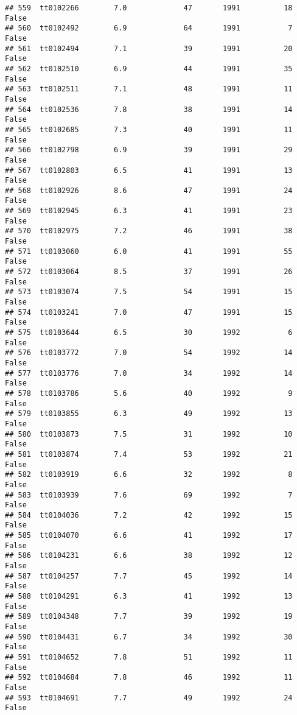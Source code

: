 \documentclass[
]{article}
\begin{document}
\begin{verbatim}
## 559  tt0102266        7.0             47       1991          18   False
## 560  tt0102492        6.9             64       1991           7   False
## 561  tt0102494        7.1             39       1991          20   False
## 562  tt0102510        6.9             44       1991          35   False
## 563  tt0102511        7.1             48       1991          11   False
## 564  tt0102536        7.8             38       1991          14   False
## 565  tt0102685        7.3             40       1991          11   False
## 566  tt0102798        6.9             39       1991          29   False
## 567  tt0102803        6.5             41       1991          13   False
## 568  tt0102926        8.6             47       1991          24   False
## 569  tt0102945        6.3             41       1991          23   False
## 570  tt0102975        7.2             46       1991          38   False
## 571  tt0103060        6.0             41       1991          55   False
## 572  tt0103064        8.5             37       1991          26   False
## 573  tt0103074        7.5             54       1991          15   False
## 574  tt0103241        7.0             47       1991          15   False
## 575  tt0103644        6.5             30       1992           6   False
## 576  tt0103772        7.0             54       1992          14   False
## 577  tt0103776        7.0             34       1992          14   False
## 578  tt0103786        5.6             40       1992           9   False
## 579  tt0103855        6.3             49       1992          13   False
## 580  tt0103873        7.5             31       1992          10   False
## 581  tt0103874        7.4             53       1992          21   False
## 582  tt0103919        6.6             32       1992           8   False
## 583  tt0103939        7.6             69       1992           7   False
## 584  tt0104036        7.2             42       1992          15   False
## 585  tt0104070        6.6             41       1992          17   False
## 586  tt0104231        6.6             38       1992          12   False
## 587  tt0104257        7.7             45       1992          14   False
## 588  tt0104291        6.3             41       1992          13   False
## 589  tt0104348        7.7             39       1992          19   False
## 590  tt0104431        6.7             34       1992          30   False
## 591  tt0104652        7.8             51       1992          11   False
## 592  tt0104684        7.8             46       1992          11   False
## 593  tt0104691        7.7             49       1992          24   False

\end{verbatim}
\end{document}
